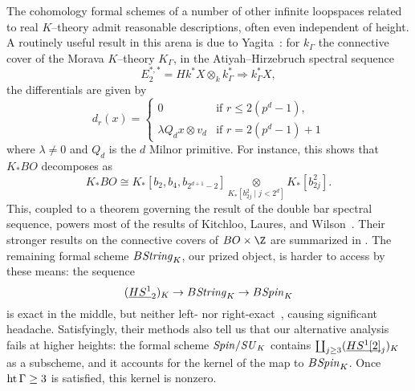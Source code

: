 \begin{remark}
The cohomology formal schemes of a number of other infinite loopspaces related to real \(K\)--theory admit reasonable descriptions, often even independent of height.  A routinely useful result in this arena is due to Yagita~\cite[Lemma 2.1]{Yagita}: for \(k_\Gamma\) the connective cover of the Morava \(K\)--theory \(K_\Gamma\), in the Atiyah--Hirzebruch spectral sequence \[E_2^{*, *} = Hk^* X \otimes_k k_\Gamma^* \Rightarrow k_\Gamma^* X,\] the differentials are given by \[d_r(x) = \begin{cases} 0 & \text{if \(r \le 2(p^d - 1)\)}, \\ \lambda Q_d x \otimes v_d & \text{if \(r = 2(p^d - 1) + 1\)} \end{cases}\] where \(\lambda \ne 0\) and \(Q_d\) is the \(d\){\th} Milnor primitive.  For instance, this shows that \(K_* BO\) decomposes as \[K_* BO \cong K_*[b_2, b_4, b_{2^{d+1}-2}] \underset{K_*[b_{2j}^2 \mid j < 2^d]}{\otimes} K_*[b_{2j}^2].\]  This, coupled to a theorem governing the result of the double bar spectral sequence, powers most of the results of Kitchloo, Laures, and Wilson~\cite[Section 4]{KLW}.  Their stronger results on the connective covers of \(BO \times \Z\) are summarized in .  The remaining formal scheme \(B\mathit{String}_K\), our prized object, is harder to access by these means: the sequence \[(\OS{HS^1}{2})_K \to B\String_K \to B\Spin_K\] is exact in the middle, but neither left- nor right-exact~\cite[pg.\ 234]{KLW}, causing significant headache.  Satisfyingly, their methods also tell us that our alternative analysis fails at higher heights: the formal scheme \(\mathit{Spin}/\mathit{SU}_K\) contains \(\coprod_{j \ge 3} (\OS{HS^1[2]}{j})_K\) as a subscheme, and it accounts for the kernel of the map to \(B\mathit{Spin}_K\).  Once \(\operatorname{ht} \Gamma \ge 3\) is satisfied, this kernel is nonzero.
\end{remark}

